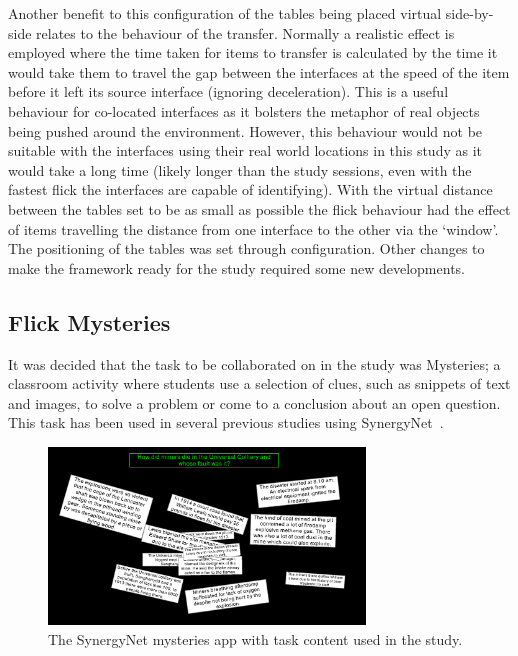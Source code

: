 \documentclass[a4paper,11pt]{article}
\begin{document}
Another benefit to this configuration of the tables being placed virtual side-by-side relates to the behaviour of the transfer.
Normally a realistic effect is employed where the time taken for items to transfer is calculated by the time it would take them to travel the gap between the interfaces at the speed of the item before it left its source interface (ignoring deceleration).
This is a useful behaviour for co-located interfaces as it bolsters the metaphor of real objects being pushed around the environment.
However, this behaviour would not be suitable with the interfaces using their real world locations in this study as it would take a long time (likely longer than the study sessions, even with the fastest flick the interfaces are capable of identifying).
With the virtual distance between the tables set to be as small as possible the flick behaviour had the effect of items travelling the distance from one interface to the other via the `window'.
The positioning of the tables was set through configuration.
Other changes to make the framework ready for the study required some new developments.

\subsection{Flick Mysteries}

It was decided that the task to be collaborated on in the study was Mysteries; a classroom activity where students use a selection of clues, such as snippets of text and images, to solve a problem or come to a conclusion about an open question.
This task has been used in several previous studies using SynergyNet~\cite{mercier:2013,mercier:2014,mercier:2015}.

\begin{figure}[h]
 \centering
   \includegraphics[width=0.75\textwidth]{figures/flickmysteryexample.png}
   \caption{The SynergyNet mysteries app with task content used in the study.}
   \label{fig:FlickMysteryExample}
\end{figure}
\end{document}

